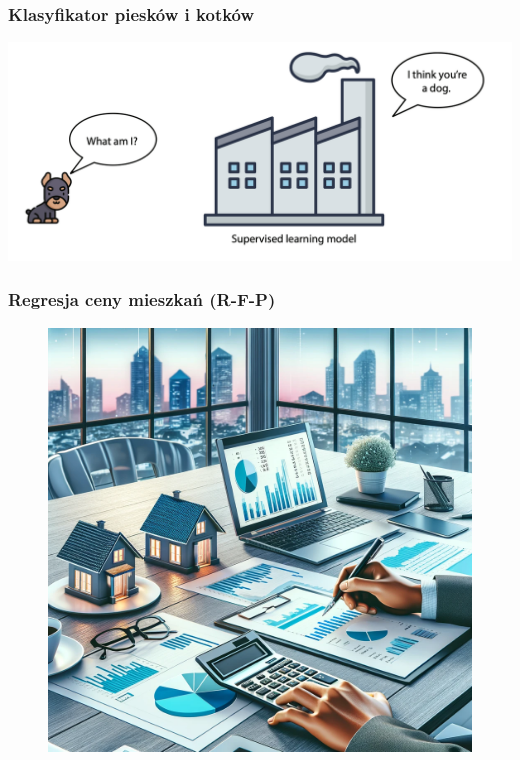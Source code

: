 \documentclass[smaller]{beamer}
\begin{document}

\begin{frame}
\frametitle{Klasyfikator piesków i kotków}
\includegraphics[width=\textwidth,height=0.8\textheight,keepaspectratio]{../manifest/r-f-p-3.png}
\end{frame}


\begin{frame}
\frametitle{Regresja ceny mieszkań (R-F-P)}
\begin{figure}
    \centering
    \includegraphics[width=\textwidth,height=0.7\textheight,keepaspectratio]{../manifest/real-estate.png}
\end{figure}
\end{frame}
\end{document}
